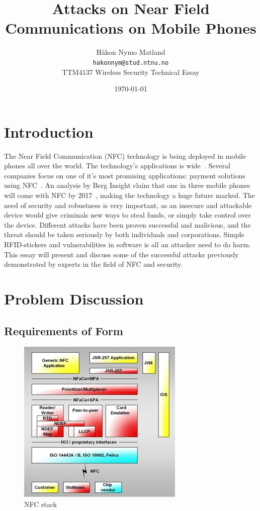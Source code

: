 \documentclass[a4paper,11pt]{article}
\title{Attacks on Near Field Communications on Mobile Phones}
\author{Håkon Nymo Matland \\
	\texttt{hakonnym@stud.ntnu.no}\\
	TTM4137 Wireless Security Technical Essay}
\date{\today}
\begin{document}
\maketitle

\section{Introduction}
The Near Field Communication (NFC) technology is being deployed in mobile phones all over the world. The technology's applications is wide~\cite{remedios2006nfc}. Several companies focus on one of it's most promising applications: payment solutions using NFC~\cite{tan2013}. An analysis by Berg Insight claim that one in three mobile phones will come with NFC by 2017~\cite{nfc_growth}, making the technology a huge future marked.
The need of security and robustness is very important, as an insecure and attackable device would give criminals new ways to steal funds, or simply take control over the device. Different attacks have been proven successful and malicious, and the threat should be taken seriously by both individuals and corporations. Simple RFID-stickers and vulnerabilities in software is all an attacker need to do harm. This essay will present and discuss some of the successful attacks previously demonstrated by experts in the field of NFC and security.


\section{Problem Discussion}

\subsection{Requirements of Form}

\begin{figure}
  \centering
  \includegraphics[scale=0.2]{nfc_stack} %
  \vspace{-0.2cm}
  \caption{NFC stack}
  \label{fig:nfc_stack}
\end{figure}
\end{document}
